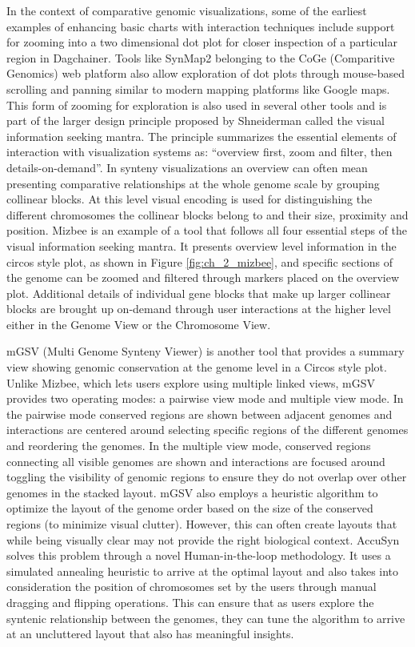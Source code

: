 In the context of comparative genomic visualizations, some of the earliest examples of enhancing basic charts with interaction techniques include support for zooming into a two dimensional dot plot for closer inspection of a particular region in Dagchainer\cite{haas2004dagchainer}. Tools like SynMap2\cite{haug2017synmap2} belonging to the CoGe (Comparitive Genomics)\cite{coge} web platform also allow exploration of dot plots through mouse-based scrolling and panning similar to modern mapping platforms like Google maps. This form of zooming for exploration is also used in several other tools and is part of the larger design principle proposed by Shneiderman\cite{Shneiderman96theeyes} called the visual information seeking mantra. The principle summarizes the essential elements of interaction with visualization systems as: ``overview first, zoom and filter, then details-on-demand''. In synteny visualizations an overview can often mean presenting comparative relationships at the whole genome scale by grouping collinear blocks. At this level visual encoding is used for distinguishing the different chromosomes the collinear blocks belong to and their size, proximity and position. Mizbee is an example of a tool that follows all four essential steps of the visual information seeking mantra\cite{Meyer2009}. It presents overview level information in the circos style plot, as shown in Figure \ref{fig:ch_2_mizbee}, and specific sections of the genome can be zoomed and filtered through markers placed on the overview plot. Additional details of individual gene blocks that make up larger collinear blocks are brought up on-demand through user interactions at the higher level either in the Genome View or the  Chromosome View. 

mGSV (Multi Genome Synteny Viewer) is another tool that provides a summary view showing genomic conservation at the genome level in a Circos style plot\cite{revanna2011gsv}. Unlike Mizbee, which lets users explore using multiple linked views, mGSV provides two operating modes: a pairwise view mode and multiple view mode. In the pairwise mode conserved regions are shown between adjacent genomes and interactions are centered around selecting specific regions of the different genomes and reordering the genomes. In the multiple view mode, conserved regions connecting all visible genomes are shown and interactions are focused around toggling the visibility of genomic regions to ensure they do not overlap over other genomes in the stacked layout. mGSV also employs a heuristic algorithm to optimize the layout of the genome order based on the size of the conserved regions (to minimize visual clutter). However, this 
can often create layouts that while being visually clear may not provide the right biological context. AccuSyn solves this problem through a novel Human-in-the-loop methodology\cite{accusyn}. It uses a simulated annealing heuristic to arrive at the optimal layout and also takes into consideration the position of chromosomes set by the users through manual dragging and flipping operations. This can ensure that as users explore the syntenic relationship between the genomes, they can tune the algorithm to arrive at an uncluttered layout that also has meaningful insights.

